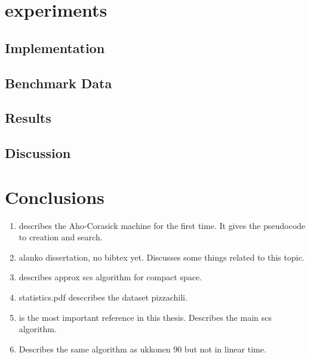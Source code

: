 \documentclass[english,twoside,censored,csm,algorithms-track-2020]{HYthesisML}
\theoremstyle{plain}
\theoremstyle{definition}
\begin{document}


\chapter{experiments}

  \section{Implementation}

  \section{Benchmark Data}

  \section{Results}

  \section{Discussion}

%
\chapter{Conclusions}
  

  \begin{enumerate}
  \item \citep{Aho75} describes the Aho-Corasick machine for the first time. It gives the pseudocode to creation and search.
  \item alanko dissertation, no bibtex yet. Discusses some things related to this topic.
  \item \citep{Alanko17} describes approx scs algorithm for compact space.
  \item statistics.pdf desccribes the dataset pizzachili.
  \item \citep{Ukkonen90} is the most important reference in this thesis. Describes the main scs algorithm.
  \item \citep{Tarhio88} Describes the same algorithm as ukkonen 90 but not in linear time.
  \end{enumerate}
\end{document}
